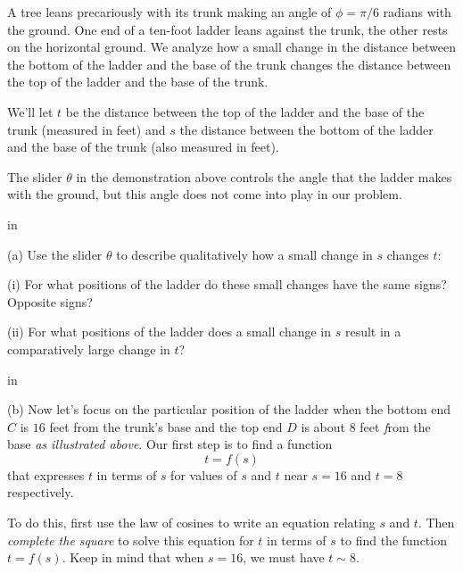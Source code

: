 \documentclass{ximera}
\newcommand{\pskip}{\vskip 0.1 in}
\begin{document}
\begin{example}  \label{Ex324trertg}

A tree leans precariously with its trunk making an angle of $\phi = \pi/6$ radians with the ground. One end of a ten-foot ladder leans against the trunk, the other rests on the horizontal ground. We analyze how a small change in the distance between the bottom of the ladder and the base of the trunk changes the distance between the top of the ladder and the base of the trunk.


 
\begin{onlineOnly}
    \begin{center}
\end{center}
\end{onlineOnly}

We'll let $t$ be the distance between the top of the ladder and the base of the trunk (measured in feet) and $s$ the distance between the bottom of the ladder and the base of the trunk (also measured in feet).

The slider $\theta$ in the demonstration above controls the angle that the ladder makes with the ground, but this angle does not come into play in our problem.

\pskip

(a) Use the slider $\theta$ to describe qualitatively how a small change in $s$ changes $t$:

(i) For what positions of the ladder do these small changes have the same signs? Opposite signs?

(ii) For what positions of the ladder does a small change in $s$ result in a comparatively large change in $t$?

\pskip

(b) Now let's focus on the particular position of the ladder when the bottom end $C$ is $16$ feet from the trunk's base and the top end $D$ is about $8$ feet \emph from the base \emph{as illustrated above}. Our first step is to find a function 
\[
   t = f(s) 
\]
that expresses $t$ in terms of $s$ for values of $s$ and $t$ near $s=16$ and $t=8$ respectively. 

To do this, first use the law of cosines to write an equation relating $s$ and $t$. Then \emph{complete the square} to solve this equation for $t$ in terms of $s$ to find the function $t = f(s)$. Keep in mind that when $s=16$, we must have $t\sim 8$. %



\end{example}
\end{document}
